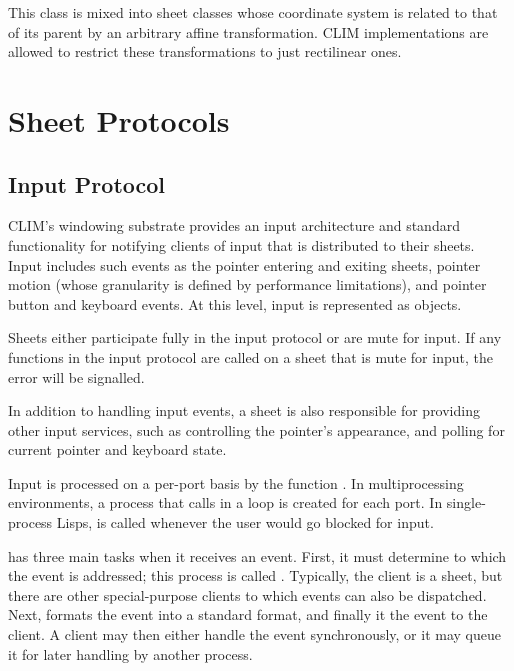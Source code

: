 
This class is mixed into sheet classes whose coordinate system is related to
that of its parent by an arbitrary affine transformation.  CLIM implementations
are allowed to restrict these transformations to just rectilinear ones.


\chapter {Sheet Protocols}
\label {sheet-protocols}

\section {Input Protocol}

CLIM's windowing substrate provides an input architecture and standard
functionality for notifying clients of input that is distributed to their
sheets.  Input includes such events as the pointer entering and exiting sheets,
pointer motion (whose granularity is defined by performance limitations), and
pointer button and keyboard events.  At this level, input is represented as
 objects.

Sheets either participate fully in the input protocol or are mute for input.  If
any functions in the input protocol are called on a sheet that is mute for
input, the  error will be signalled.

In addition to handling input events, a sheet is also responsible for providing
other input services, such as controlling the pointer's appearance, and polling
for current pointer and keyboard state.

Input is processed on a per-port basis by the function .
In multiprocessing environments, a process that calls  in a
loop is created for each port.  In single-process Lisps, 
is called whenever the user would go blocked for input.

 has three main tasks when it receives an event.  First,
it must determine to which  the event is addressed; this process
is called .  Typically, the client is a sheet, but there
are other special-purpose clients to which events can also be dispatched.  Next,
 formats the event into a standard format, and finally it
 the event to the client.  A client may then either handle
the event synchronously, or it may queue it for later handling by another
process.

